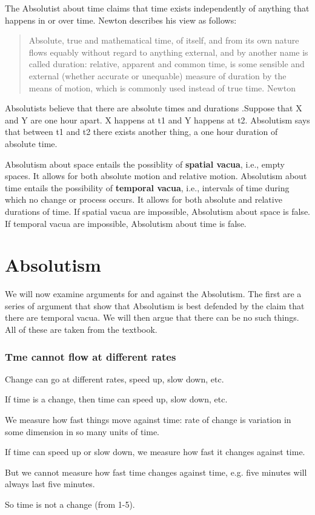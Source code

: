 \documentclass[oneside]{article}
\begin{document}
The Absolutist about time claims that time exists independently of anything that happens in or over time. Newton describes his view as follows:  

\begin{quote}
Absolute, true and mathematical time, of itself, and from its own nature flows equably without regard to anything external, and by another name is called duration: relative, apparent and common time, is some sensible and external (whether accurate or unequable) measure of duration by the means of motion, which is commonly used instead of true time. Newton
\end{quote}
Absolutists believe that there are absolute times and durations .Suppose that X and Y are one hour apart. X happens at t1 and Y happens at t2. Absolutism says that between t1 and t2 there exists another thing, a one hour duration of absolute time. 

Absolutism about space entails the possiblity of \textbf{spatial vacua}, i.e., empty spaces. It allows for both absolute motion and relative motion.  Absolutism about time entails the possibility of \textbf{temporal vacua}, i.e., intervals of time during which no change or process occurs. It allows for both absolute and relative durations of time. If spatial vacua are impossible, Absolutism about space is false. If temporal vacua are impossible, Absolutism about time is false. 







\section*{Absolutism}

We will now examine arguments for and against the Absolutism. The first are a series of argument that show that Absolutism is best defended by the claim that there are temporal vacua. We will then argue that there can be no such things. All of these are taken from the textbook.


\subsubsection*{Tme cannot flow at different rates}
\begin{enumerate*}
\item Change can go at different rates, speed up, slow down, etc. 
\item If time is a change, then time can speed up, slow down, etc. 
\item We measure how fast things move against time:  rate of change is variation in some dimension in so many units of time.
\item If time can speed up or slow down, we measure how fast it changes against time. 
\item But we cannot measure how fast time changes against time, e.g. five minutes will always last five minutes.  
\item So time is not a change (from 1-5).
\end{enumerate*}
\end{document}
